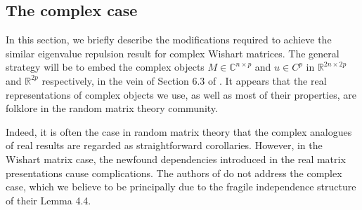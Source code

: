 \documentclass[11pt]{article}
\numberwithin{equation}{section}
\theoremstyle{remark}
\newcommand{\R}{\mathbb{R}}
\newcommand{\C}{\mathbb{C}}
\begin{document}
\subsection{The complex case}\label{subsec-repulsion-complex}
In this section, we briefly describe the modifications required to achieve the similar eigenvalue repulsion result for complex Wishart matrices. The general strategy will be to embed the complex objects $M \in \C^{n \times p}$ and $u \in C^{p}$ in $\R^{2n \times 2p}$ and $\R^{2p}$ respectively, in the vein of Section 6.3 of \cite{nguyen2015randommatricestailbounds}. It appears that the real representations of complex objects we use, as well as most of their properties, are folklore in the random matrix theory community. 

Indeed, it is often the case in random matrix theory that the complex analogues of real results are regarded as straightforward corollaries. However, in the Wishart matrix case, the newfound dependencies introduced in the real matrix presentations cause complications. The authors of \cite{christoffersen2025gaps} do not address the complex case, which we believe to be principally due to the fragile independence structure of their Lemma 4.4.
\end{document}
